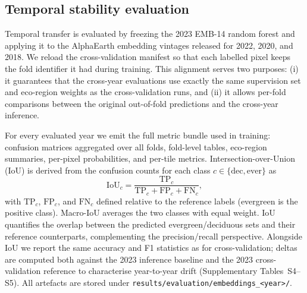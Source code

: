 \documentclass[utf8]{FrontiersinHarvard}
\begin{document}
\subsection{Temporal stability evaluation}
Temporal transfer is evaluated by freezing the 2023 EMB-14 random forest and applying it to the AlphaEarth embedding vintages released for 2022, 2020, and 2018. We reload the cross-validation manifest so that each labelled pixel keeps the fold identifier it had during training. This alignment serves two purposes: (i) it guarantees that the cross-year evaluations use exactly the same supervision set and eco-region weights as the cross-validation runs, and (ii) it allows per-fold comparisons between the original out-of-fold predictions and the cross-year inference.

For every evaluated year we emit the full metric bundle used in training: confusion matrices aggregated over all folds, fold-level tables, eco-region summaries, per-pixel probabilities, and per-tile metrics. Intersection-over-Union (IoU) is derived from the confusion counts for each class \(c \in \{\text{dec}, \text{ever}\}\) as
\begin{equation*}
    \mathrm{IoU}_c = \frac{\mathrm{TP}_c}{\mathrm{TP}_c + \mathrm{FP}_c + \mathrm{FN}_c},
\end{equation*}
with \(\mathrm{TP}_c\), \(\mathrm{FP}_c\), and \(\mathrm{FN}_c\) defined relative to the reference labels (evergreen is the positive class). Macro-IoU averages the two classes with equal weight. IoU quantifies the overlap between the predicted evergreen/deciduous sets and their reference counterparts, complementing the precision/recall perspective. Alongside IoU we report the same accuracy and F1 statistics as for cross-validation; deltas are computed both against the 2023 inference baseline and the 2023 cross-validation reference to characterise year-to-year drift (Supplementary Tables~S4–S5). All artefacts are stored under \texttt{results/evaluation/embeddings\_<year>/}.
\end{document}
